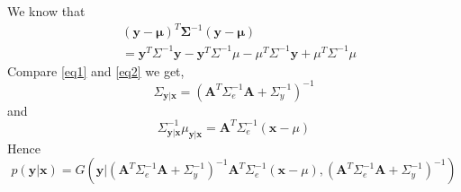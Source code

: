 \documentclass{article}
\begin{document}
We know that
\begin{equation}
  \label{eq2}
  \begin{split}
    &(\mathbf{y}-\mathbf{\mu})^T\mathbf{\Sigma}^{-1}(\mathbf{y}-\mathbf{\mu})\\
    &=\mathbf{y}^T\Sigma^{-1}\mathbf{y}-\mathbf{y}^T\Sigma^{-1}\mu-\mu^T\Sigma^{-1}\mathbf{y}+\mu^T\Sigma^{-1}\mu
  \end{split}
\end{equation}
Compare \ref{eq1} and \ref{eq2} we get,
\begin{equation}
  \Sigma_{\mathbf{y|x}}=(\mathbf{A}^T\Sigma_e^{-1}\mathbf{A}+\Sigma_y^{-1})^{-1}  
\end{equation}
and 
\begin{equation}
  \Sigma_{\mathbf{y|x}}^{-1}\mu_{\mathbf{y}|\mathbf{x}}=\mathbf{A}^T\Sigma_e^{-1}(\mathbf{x}-\mu)  
\end{equation}
Hence
\begin{equation}
  p(\mathbf{y}|\mathbf{x})=G(\mathbf{y}|(\mathbf{A}^T\Sigma_e^{-1}\mathbf{A}+\Sigma_y^{-1})^{-1}\mathbf{A}^T\Sigma_e^{-1}(\mathbf{x}-\mu), (\mathbf{A}^T\Sigma_e^{-1}\mathbf{A}+\Sigma_y^{-1})^{-1})  
\end{equation}
\end{document}
